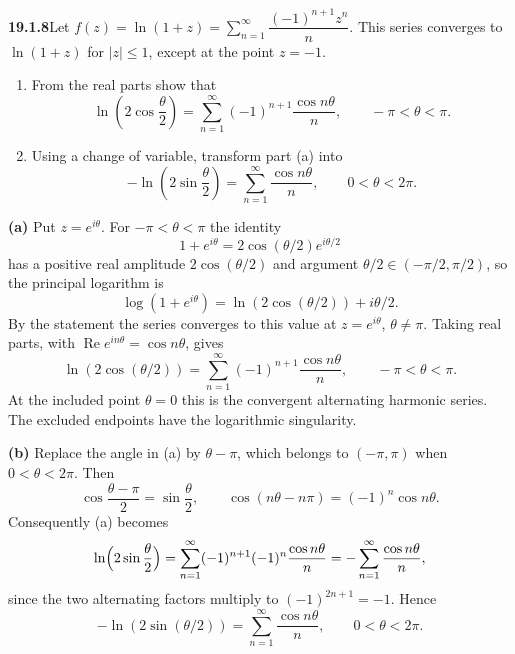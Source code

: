 \par\bigskip
\noindent\textbf{19.1.8}\quad Let
$f(z)=\ln(1+z)=\displaystyle\sum_{n=1}^{\infty}
\dfrac{(-1)^{n+1}z^{n}}{n}$. This series converges to $\ln(1+z)$
for $|z| \le 1$, except at the point $z=-1$.
\begin{enumerate}
\item[(a)] From the real parts show that
\[
\ln\left(2\cos\frac{\theta}{2}\right)
=\sum_{n=1}^{\infty}(-1)^{n+1}\frac{\cos n\theta}{n},
\qquad-\pi<\theta<\pi.
\]
\item[(b)] Using a change of variable, transform part (a) into
\[
-\ln\left(2\sin\frac{\theta}{2}\right)
=\sum_{n=1}^{\infty}\frac{\cos n\theta}{n},
\qquad0<\theta<2\pi.
\]
\end{enumerate}
\solution
\textbf{(a)} Put $z=e^{i\theta}$. For $-\pi<\theta<\pi$ the identity
\[
1+e^{i\theta}=2\cos(\theta/2)e^{i\theta/2}
\]
has a positive real amplitude $2\cos(\theta/2)$ and argument
$\theta/2\in(-\pi/2,\pi/2)$, so the principal logarithm is
\[
\log(1+e^{i\theta})=\ln(2\cos(\theta/2))+i\theta/2.
\]
By the statement the series converges to this value at $z=e^{i\theta}$,
$\theta\ne\pi$. Taking real parts, with
$\operatorname{Re}e^{in\theta}=\cos n\theta$, gives
\[
\boxed{\ln(2\cos(\theta/2))
=\sum_{n=1}^{\infty}(-1)^{n+1}\frac{\cos n\theta}{n},
\qquad-\pi<\theta<\pi.}
\]
At the included point $\theta=0$ this is the convergent alternating
harmonic series. The excluded endpoints have the logarithmic singularity.

\textbf{(b)} Replace the angle in (a) by $\theta-\pi$, which belongs
to $(-\pi,\pi)$ when $0<\theta<2\pi$. Then
\[
\cos\frac{\theta-\pi}{2}=\sin\frac\theta2,
\qquad \cos(n\theta-n\pi)=(-1)^n\cos n\theta.
\]
Consequently (a) becomes
\[
\ln\Bigl(2\sin\frac\theta2\Bigr)
=\sum_{n=1}^{\infty}(-1)^{n+1}(-1)^n\frac{\cos n\theta}{n}
=-\sum_{n=1}^{\infty}\frac{\cos n\theta}{n},
\]
since the two alternating factors multiply to $(-1)^{2n+1}=-1$. Hence
\[
\boxed{-\ln(2\sin(\theta/2))
=\sum_{n=1}^{\infty}\frac{\cos n\theta}{n},\qquad0<\theta<2\pi.}
\]

